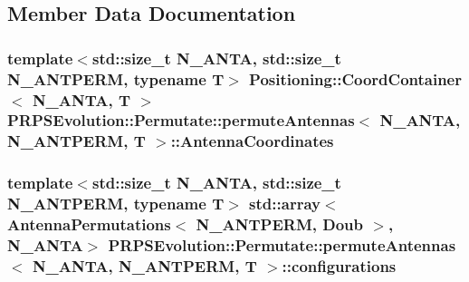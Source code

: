 \subsection{\-Member \-Data \-Documentation}
\hypertarget{struct_p_r_p_s_evolution_1_1_permutate_1_1permute_antennas_a56226c0c761aaa257d0eaa701b19c835}{
\subsubsection[{\-Antenna\-Coordinates}]{\setlength{\rightskip}{0pt plus 5cm}template$<$std\-::size\-\_\-t \-N\-\_\-\-A\-N\-T\-A, std\-::size\-\_\-t \-N\-\_\-\-A\-N\-T\-P\-E\-R\-M, typename \-T$>$ {\bf \-Positioning\-::\-Coord\-Container}$<$ \-N\-\_\-\-A\-N\-T\-A, \-T $>$ {\bf \-P\-R\-P\-S\-Evolution\-::\-Permutate\-::permute\-Antennas}$<$ \-N\-\_\-\-A\-N\-T\-A, \-N\-\_\-\-A\-N\-T\-P\-E\-R\-M, \-T $>$\-::{\bf \-Antenna\-Coordinates}}}\label{struct_p_r_p_s_evolution_1_1_permutate_1_1permute_antennas_a56226c0c761aaa257d0eaa701b19c835}
\hypertarget{struct_p_r_p_s_evolution_1_1_permutate_1_1permute_antennas_a98128f0b9e99559dc537c67b200ec18c}{
\subsubsection[{configurations}]{\setlength{\rightskip}{0pt plus 5cm}template$<$std\-::size\-\_\-t \-N\-\_\-\-A\-N\-T\-A, std\-::size\-\_\-t \-N\-\_\-\-A\-N\-T\-P\-E\-R\-M, typename \-T$>$ std\-::array$<$ {\bf \-Antenna\-Permutations}$<$ \-N\-\_\-\-A\-N\-T\-P\-E\-R\-M, \-Doub $>$, \-N\-\_\-\-A\-N\-T\-A$>$ {\bf \-P\-R\-P\-S\-Evolution\-::\-Permutate\-::permute\-Antennas}$<$ \-N\-\_\-\-A\-N\-T\-A, \-N\-\_\-\-A\-N\-T\-P\-E\-R\-M, \-T $>$\-::{\bf configurations}}}\label{struct_p_r_p_s_evolution_1_1_permutate_1_1permute_antennas_a98128f0b9e99559dc537c67b200ec18c}

